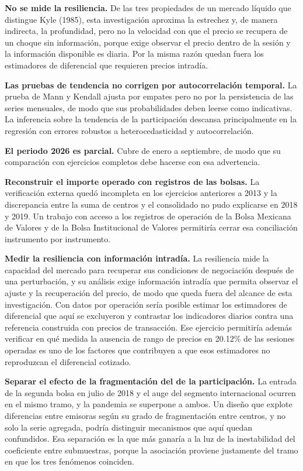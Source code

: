 \textbf{No se mide la resiliencia.} De las tres propiedades de un mercado líquido que distingue Kyle (1985), esta investigación aproxima la estrechez y, de manera indirecta, la profundidad, pero no la velocidad con que el precio se recupera de un choque sin información, porque exige observar el precio dentro de la sesión y la información disponible es diaria. Por la misma razón quedan fuera los estimadores de diferencial que requieren precios intradía.

\textbf{Las pruebas de tendencia no corrigen por autocorrelación temporal.} La prueba de Mann y Kendall ajusta por empates pero no por la persistencia de las series mensuales, de modo que sus probabilidades deben leerse como indicativas. La inferencia sobre la tendencia de la participación descansa principalmente en la regresión con errores robustos a heterocedasticidad y autocorrelación.

\textbf{El periodo 2026 es parcial.} Cubre de enero a septiembre, de modo que su comparación con ejercicios completos debe hacerse con esa advertencia.


\textbf{Reconstruir el importe operado con registros de las bolsas.} La verificación externa quedó incompleta en los ejercicios anteriores a 2013 y la discrepancia entre la suma de centros y el consolidado no pudo explicarse en 2018 y 2019. Un trabajo con acceso a los registros de operación de la Bolsa Mexicana de Valores y de la Bolsa Institucional de Valores permitiría cerrar esa conciliación instrumento por instrumento.

\textbf{Medir la resiliencia con información intradía.} La resiliencia mide la capacidad del mercado para recuperar sus condiciones de negociación después de una perturbación, y su análisis exige información intradía que permita observar el ajuste y la recuperación del precio, de modo que queda fuera del alcance de esta investigación. Con datos por operación sería posible estimar los estimadores de diferencial que aquí se excluyeron y contrastar los indicadores diarios contra una referencia construida con precios de transacción. Ese ejercicio permitiría además verificar en qué medida la ausencia de rango de precios en 20.12\% de las sesiones operadas es uno de los factores que contribuyen a que esos estimadores no reproduzcan el diferencial cotizado.

\textbf{Separar el efecto de la fragmentación del de la participación.} La entrada de la segunda bolsa en julio de 2018 y el auge del segmento internacional ocurren en el mismo tramo, y la pandemia se superpone a ambos. Un diseño que explote diferencias entre emisoras según su grado de fragmentación entre centros, y no solo la serie agregada, podría distinguir mecanismos que aquí quedan confundidos. Esa separación es la que más ganaría a la luz de la inestabilidad del coeficiente entre submuestras, porque la asociación proviene justamente del tramo en que los tres fenómenos coinciden.

